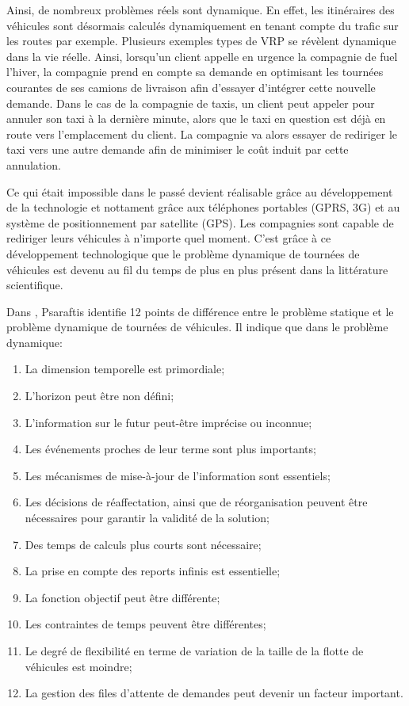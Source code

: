 Ainsi, de nombreux problèmes réels sont dynamique. En effet, les itinéraires des véhicules sont désormais calculés dynamiquement en tenant compte du trafic sur les routes par exemple. Plusieurs exemples types de VRP se révèlent dynamique dans la vie réelle. Ainsi, lorsqu'un client appelle en urgence la compagnie de fuel l'hiver, la compagnie prend en compte sa demande en optimisant les tournées courantes de ses camions de livraison afin d'essayer d'intégrer cette nouvelle demande. Dans le cas de la compagnie de taxis, un client peut appeler pour annuler son taxi à la dernière minute, alors que le taxi en question est déjà en route vers l'emplacement du client. La compagnie va alors essayer de rediriger le taxi vers une autre demande afin de minimiser le coût induit par cette annulation.

Ce qui était impossible dans le passé devient réalisable grâce au développement de la technologie et nottament grâce aux téléphones portables (GPRS, 3G) et au système de positionnement par satellite (GPS). Les compagnies sont capable de rediriger leurs véhicules à n'importe quel moment. C'est grâce à ce développement technologique que le problème dynamique de tournées de véhicules est devenu au fil du temps de plus en plus présent dans la littérature scientifique.

Dans \cite{Psaraftis1988}, Psaraftis identifie 12 points de différence entre le problème statique et le problème dynamique de tournées de véhicules. Il indique que dans le problème dynamique:
\begin{enumerate}
 \item La dimension temporelle est primordiale;
 \item L'horizon peut être non défini;
 \item L'information sur le futur peut-être imprécise ou inconnue;
 \item Les événements proches de leur terme sont plus importants;
 \item Les mécanismes de mise-à-jour de l'information sont essentiels;
 \item Les décisions de réaffectation, ainsi que de réorganisation peuvent être nécessaires pour garantir la validité de la solution;
 \item Des temps de calculs plus courts sont nécessaire;
 \item La prise en compte des reports infinis est essentielle;
 \item La fonction objectif peut être différente;
 \item Les contraintes de temps peuvent être différentes;
 \item Le degré de flexibilité en terme de variation de la taille de la flotte de véhicules est moindre;
 \item La gestion des files d'attente de demandes peut devenir un facteur important.
\end{enumerate}

